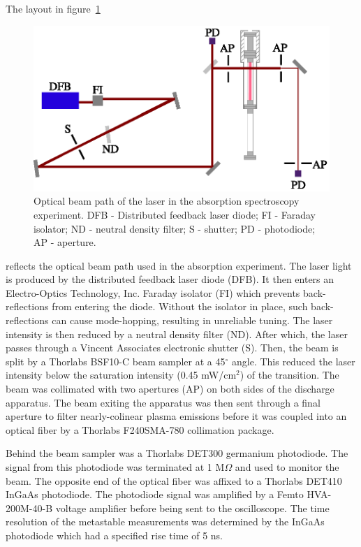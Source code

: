 The layout in figure~\ref{fig:laser}
\begin{figure}
  \centering
  \includegraphics{./chapters/metastables/figures/laser.eps}
  \caption{Optical beam path of the laser in the absorption spectroscopy
  experiment. DFB - Distributed feedback laser diode; FI - Faraday isolator; ND -
  neutral density filter; S - shutter; PD - photodiode; AP - aperture.}
  \label{fig:laser}
\end{figure}
reflects the optical beam path used in the absorption experiment. The laser
light is produced by the distributed feedback laser diode (DFB). It then enters
an Electro-Optics Technology, Inc. Faraday isolator (FI) which prevents
back-reflections from entering the diode. Without the isolator in place, such
back-reflections can cause mode-hopping, resulting in unreliable tuning. The
laser intensity is then reduced by a neutral density filter (ND). After which,
the laser passes through a Vincent Associates electronic shutter (S). Then, the
beam is split by a Thorlabs BSF10-C beam sampler at a 45$^\circ$ angle. This
reduced the laser intensity below the saturation intensity (0.45 mW/cm$^2$) of
the transition. The beam was collimated with two apertures (AP) on both sides of
the discharge apparatus. The beam exiting the apparatus was then sent through a
final aperture to filter nearly-colinear plasma emissions before it was coupled
into an optical fiber by a Thorlabs F240SMA-780 collimation package.

Behind the beam sampler was a Thorlabs DET300 germanium photodiode. The signal
from this photodiode was terminated at 1 M$\Omega$ and used to monitor the beam.
The opposite end of the optical fiber was affixed to a Thorlabs DET410 InGaAs
photodiode. The photodiode signal was amplified by a Femto HVA-200M-40-B voltage
amplifier before being sent to the oscilloscope. The time resolution of the
metastable measurements was determined by the InGaAs photodiode which had a
specified rise time of 5 ns.


